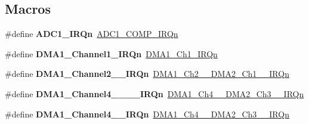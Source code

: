 \subsection*{Macros}
\begin{DoxyCompactItemize}
\item 
\mbox{\label{group__stm32f098xx_gaa7d642ec0ffe7089d01841fe5992321c}} 
\#define {\bfseries A\+D\+C1\+\_\+\+I\+R\+Qn}~\hyperlink{group___peripheral__interrupt__number__definition_gga7e1129cd8a196f4284d41db3e82ad5c8a1f21d9fac09be01d78b835759e21d012}{A\+D\+C1\+\_\+\+C\+O\+M\+P\+\_\+\+I\+R\+Qn}
\item 
\mbox{\label{group__stm32f098xx_ga999899580f6a50ba6bee8ce4e54fbb59}} 
\#define {\bfseries D\+M\+A1\+\_\+\+Channel1\+\_\+\+I\+R\+Qn}~\hyperlink{group___peripheral__interrupt__number__definition_gga7e1129cd8a196f4284d41db3e82ad5c8a4f148c67dcf6bd03e830335c97f42b9b}{D\+M\+A1\+\_\+\+Ch1\+\_\+\+I\+R\+Qn}
\item 
\mbox{\label{group__stm32f098xx_ga0823b3bd6bcb2e00c1b4439fb912c73d}} 
\#define {\bfseries D\+M\+A1\+\_\+\+Channel2\+\_\+\_\+\+I\+R\+Qn}~\hyperlink{group___peripheral__interrupt__number__definition_gga7e1129cd8a196f4284d41db3e82ad5c8ae02e0acdda90324039b22c1a5e990990}{D\+M\+A1\+\_\+\+Ch2\+\_\+\_\+\+D\+M\+A2\+\_\+\+Ch1\+\_\+\_\+\+I\+R\+Qn}
\item 
\mbox{\label{group__stm32f098xx_gabba6cf96bd31658213f35354cf700b31}} 
\#define {\bfseries D\+M\+A1\+\_\+\+Channel4\+\_\+\_\+\_\+\_\+\+I\+R\+Qn}~\hyperlink{group___peripheral__interrupt__number__definition_gga7e1129cd8a196f4284d41db3e82ad5c8abb8480db798ed2e4a88687e128eecb88}{D\+M\+A1\+\_\+\+Ch4\+\_\+\_\+\+D\+M\+A2\+\_\+\+Ch3\+\_\+\_\+\+I\+R\+Qn}
\item 
\mbox{\label{group__stm32f098xx_ga35a41592e06a61cdced6514b54e1ceb3}} 
\#define {\bfseries D\+M\+A1\+\_\+\+Channel4\+\_\+\_\+\+I\+R\+Qn}~\hyperlink{group___peripheral__interrupt__number__definition_gga7e1129cd8a196f4284d41db3e82ad5c8abb8480db798ed2e4a88687e128eecb88}{D\+M\+A1\+\_\+\+Ch4\+\_\+\_\+\+D\+M\+A2\+\_\+\+Ch3\+\_\+\_\+\+I\+R\+Qn}
\item 
\mbox{\label{group__stm32f098xx_gaae92cbf893c67700dbc28d2ca87eac9d}} 

\end{DoxyCompactItemize}
